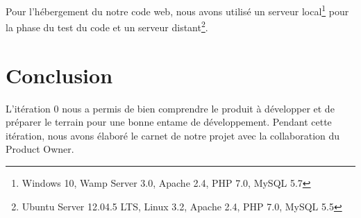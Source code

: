 Pour l'hébergement du notre code web, nous avons utilisé un serveur
local\footnote{Windows 10, Wamp Server 3.0, Apache 2.4, PHP 7.0, MySQL 5.7}
pour la phase du test du code et un serveur distant\footnote{Ubuntu Server
12.04.5 LTS, Linux 3.2, Apache 2.4, PHP 7.0, MySQL 5.5}.

\section*{Conclusion}

L'itération 0 nous a permis de bien comprendre le produit à développer et de
préparer le terrain pour une bonne entame de développement. Pendant cette
itération, nous avons élaboré le carnet de notre projet avec la collaboration
du Product Owner.
